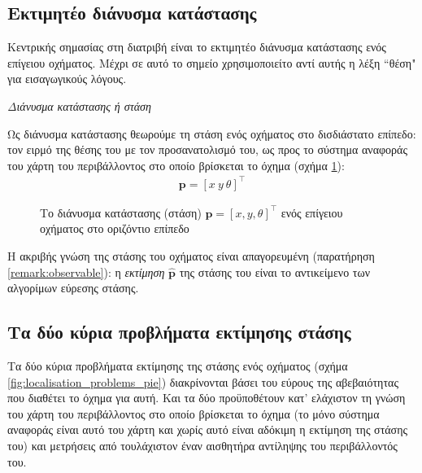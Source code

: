 \subsection{Εκτιμητέο διάνυσμα κατάστασης}
\label{subsec:01_01_02_1}

Κεντρικής σημασίας στη διατριβή είναι το εκτιμητέο διάνυσμα κατάστασης ενός
επίγειου οχήματος. Μέχρι σε αυτό το σημείο χρησιμοποιείτο αντί αυτής η λέξη
``θέση" για εισαγωγικούς λόγους.

\begin{bw_box}
\begin{definition}
  \textit{Διάνυσμα κατάστασης ή στάση}

Ως διάνυσμα κατάστασης θεωρούμε τη στάση ενός οχήματος στο δισδιάστατο επίπεδο:
τον ειρμό της θέσης του με τον προσανατολισμό του, ως προς το σύστημα αναφοράς
του χάρτη του περιβάλλοντος στο οποίο βρίσκεται το όχημα (σχήμα
\ref{fig:pose_figure}):
  \begin{align}
    \bm{p} = [x \ y \ \theta]^\top
\end{align}

\end{definition}
\end{bw_box}

\begin{figure}[htbp]\centering
  
  \caption{\small Το διάνυσμα κατάστασης (στάση) $\bm{p} = [x,y,\theta]^\top$
    ενός επίγειου οχήματος στο οριζόντιο επίπεδο}
  \label{fig:pose_figure}
\end{figure}

Η ακριβής γνώση της στάσης του οχήματος είναι απαγορευμένη (παρατήρηση
\ref{remark:observable}): η \textit{εκτίμηση} $\hat{\bm{p}}$ της στάσης του
είναι το αντικείμενο των αλγορίμων εύρεσης στάσης.



\subsection{Τα δύο κύρια προβλήματα εκτίμησης στάσης}
\label{subsec:01_01_02_2}

Τα δύο κύρια προβλήματα εκτίμησης της στάσης ενός οχήματος (σχήμα
\ref{fig:localisation_problems_pie}) διακρίνονται βάσει του εύρους της
αβεβαιότητας που διαθέτει το όχημα για αυτή.  Και τα δύο προϋποθέτουν
κατ' ελάχιστον τη γνώση του χάρτη του περιβάλλοντος στο οποίο
βρίσκεται το όχημα (το μόνο σύστημα αναφοράς είναι αυτό του χάρτη και χωρίς
αυτό είναι αδόκιμη η εκτίμηση της στάσης του) και μετρήσεις από τουλάχιστον
έναν αισθητήρα αντίληψης του περιβάλλοντός του.

